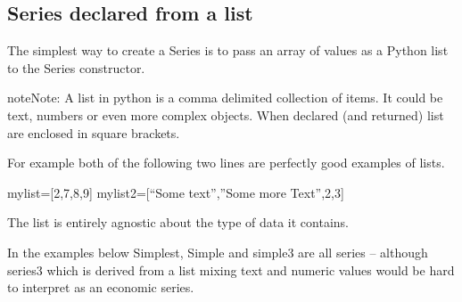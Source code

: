 \documentclass[letterpaper,10pt,english]{jupyterBook}
\begin{document}
\subsection{Series declared from a list}
\label{\detokenize{content/04_PythonEssentials/PythonPandasDataframes:series-declared-from-a-list}}
\sphinxAtStartPar
The simplest way to create a Series is to pass an array of values as a Python list to the Series constructor.

\begin{sphinxadmonition}{note}{Note:}
\sphinxAtStartPar
A list in python is a comma delimited collection of items.  It could be text, numbers or even more complex objects.  When declared (and returned) list are enclosed in square brackets.

\sphinxAtStartPar
For example both of the following two lines are perfectly good examples of lists.

\sphinxAtStartPar
mylist={[}2,7,8,9{]}
mylist2={[}“Some text”,”Some more Text”,2,3{]}

\sphinxAtStartPar
The list is entirely agnostic about the type of data it contains.
\end{sphinxadmonition}

\sphinxAtStartPar
In the examples below Simplest, Simple and simple3 are all series – although series3 which is derived from a list mixing text and numeric values would be hard to interpret as an economic series.
\end{document}
